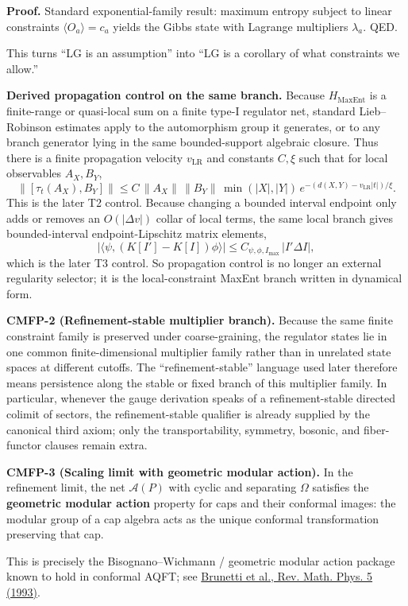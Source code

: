 \textbf{Proof.} Standard exponential-family result: maximum entropy subject to linear constraints \(\langle O_a\rangle=c_a\) yields the Gibbs state with Lagrange multipliers \(\lambda_a\). QED.

This turns ``LG is an assumption'' into ``LG is a corollary of what constraints we allow.''

\textbf{Derived propagation control on the same branch.} Because \(H_{\mathrm{MaxEnt}}\) is a finite-range or quasi-local sum on a finite type-I regulator net, standard Lieb--Robinson estimates apply to the automorphism group it generates, or to any branch generator lying in the same bounded-support algebraic closure. Thus there is a finite propagation velocity \(v_{\mathrm{LR}}\) and constants \(C,\xi\) such that for local observables \(A_X,B_Y\),
\[
\bigl\|[\tau_t(A_X),B_Y]\bigr\|
\le
C\,\|A_X\|\,\|B_Y\|\,\min(|X|,|Y|)\,
e^{-(d(X,Y)-v_{\mathrm{LR}}|t|)/\xi}.
\]
This is the later T2 control. Because changing a bounded interval endpoint only adds or removes an \(O(|\Delta v|)\) collar of local terms, the same local branch gives bounded-interval endpoint-Lipschitz matrix elements,
\[
\left|\langle\psi,(K[I']-K[I])\phi\rangle\right|
\le
C_{\psi,\phi,I_{\max}}\,|I'\Delta I|,
\]
which is the later T3 control. So propagation control is no longer an external regularity selector; it is the local-constraint MaxEnt branch written in dynamical form.

\textbf{CMFP-2 (Refinement-stable multiplier branch).} Because the same finite constraint family is preserved under coarse-graining, the regulator states lie in one common finite-dimensional multiplier family rather than in unrelated state spaces at different cutoffs. The ``refinement-stable'' language used later therefore means persistence along the stable or fixed branch of this multiplier family. In particular, whenever the gauge derivation speaks of a refinement-stable directed colimit of sectors, the refinement-stable qualifier is already supplied by the canonical third axiom; only the transportability, symmetry, bosonic, and fiber-functor clauses remain extra.

\textbf{CMFP-3 (Scaling limit with geometric modular action).} In the refinement limit, the net \(\mathcal{A}(P)\) with cyclic and separating \(\Omega\) satisfies the \textbf{geometric modular action} property for caps and their conformal images: the modular group of a cap algebra acts as the unique conformal transformation preserving that cap.

This is precisely the Bisognano--Wichmann / geometric modular action package known to hold in conformal AQFT; see \href{https://arxiv.org/abs/funct-an/9302008}{Brunetti et al., Rev. Math. Phys. 5 (1993)}.

